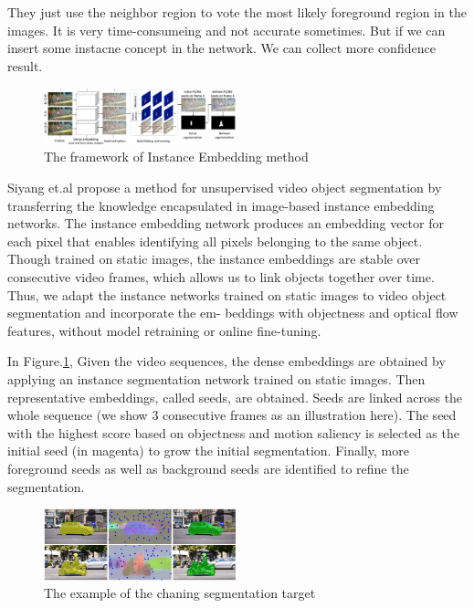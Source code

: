 They just use the neighbor region to vote the most likely foreground region in the images. It is very time-consumeing  and not accurate 
sometimes. But if we can insert some instacne concept in the network. We can collect more confidence result.



\begin{figure}[ht]
    \centering
    \includegraphics[width=0.5\textwidth]{figure/iet_arch.png}
    \caption{The framework of Instance Embedding method}
    \label{instance}
\end{figure}

Siyang et.al \cite{li2018instance} propose a method for unsupervised video object segmentation by transferring the knowledge encapsulated
in image-based instance embedding networks.
The instance embedding network produces an embedding vector for each pixel that enables identifying all pixels belonging to the same object.
Though trained on static images, the instance embeddings are stable over consecutive video frames, which allows us to link objects together over time.
Thus, we adapt the instance networks trained on static images to video object segmentation and incorporate the em-
beddings with objectness and optical flow features, without model retraining or online fine-tuning.

In Figure.\ref{instance}, Given the video sequences, the dense embeddings are obtained by applying an instance segmentation network trained on static images.
Then representative embeddings, called seeds, are obtained. Seeds are linked across the whole sequence 
(we show 3 consecutive frames as an illustration here). The seed with the highest score based on objectness and motion
saliency is selected as the initial seed (in magenta) to grow the initial segmentation. Finally, more foreground seeds as well as background
seeds are identified to refine the segmentation.
\begin{figure}[ht]
    \centering
    \includegraphics[width=0.5\textwidth]{figure/iet_1.png}
    \caption{The example of the chaning segmentation target}
    \label{example}
\end{figure}

